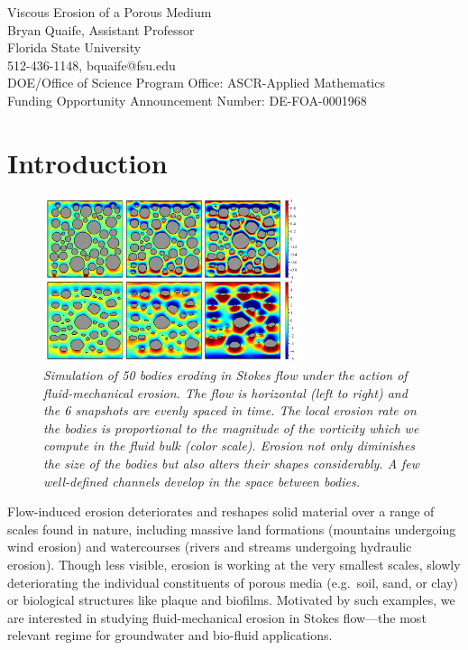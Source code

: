 \documentclass[11pt]{article}
\begin{document}
\begin{center}
Viscous Erosion of a Porous Medium \\
Bryan Quaife, Assistant Professor \\
Florida State University \\
512-436-1148, bquaife@fsu.edu \\
DOE/Office of Science Program Office: ASCR-Applied Mathematics \\
Funding Opportunity Announcement Number: DE-FOA-0001968
\end{center}

\section{Introduction}
\begin{figure}
\centering
\includegraphics[width=0.68\textwidth]{figs/50bod.pdf}
\caption{\label{fig:50bod} \em Simulation of 50 bodies eroding in Stokes
flow under the action of fluid-mechanical erosion. The flow is
horizontal (left to right) and the 6 snapshots are evenly spaced in
time.  The local erosion rate on the bodies is proportional to the
magnitude of the vorticity which we compute in the fluid bulk (color
scale).  Erosion not only diminishes the size of the bodies but also
alters their shapes considerably. A few well-defined channels develop in
the space between bodies.}
\end{figure}

Flow-induced erosion deteriorates and reshapes solid material over a
range of scales found in nature, including massive land formations
(mountains undergoing wind erosion) and watercourses (rivers and streams
undergoing hydraulic erosion).  Though less visible, erosion is working
at the very smallest scales, slowly deteriorating the individual
constituents of porous media (e.g.~soil, sand, or clay) or biological
structures like plaque and biofilms. Motivated by such examples, we are
interested in studying fluid-mechanical erosion in Stokes flow---the
most relevant regime for groundwater and bio-fluid applications.
\end{document}
